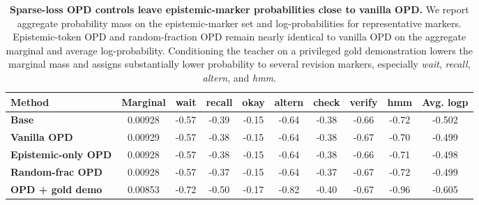 \begin{table}[!htbp]
\centering
\caption{\textbf{Sparse-loss OPD controls leave epistemic-marker probabilities close to vanilla OPD.}
We report aggregate probability mass on the epistemic-marker set and log-probabilities for representative markers. Epistemic-token OPD and random-fraction OPD remain nearly identical to vanilla OPD on the aggregate marginal and average log-probability. Conditioning the teacher on a privileged gold demonstration lowers the marginal mass and assigns substantially lower probability to several revision markers, especially \textit{wait}, \textit{recall}, \textit{altern}, and \textit{hmm}.}
\label{tab:opd_ablation_epistemic_logprobs}
\scriptsize
\setlength{\tabcolsep}{2pt}
\renewcommand{\arraystretch}{1.12}

\begin{tabular*}{\textwidth}{@{\extracolsep{\fill}}lccccccccc@{}}
\toprule
\textbf{Method}
& \textbf{Marginal}
& \textbf{wait}
& \textbf{recall}
& \textbf{okay}
& \textbf{altern}
& \textbf{check}
& \textbf{verify}
& \textbf{hmm}
& \textbf{Avg. logp} \\
\midrule
\textbf{Base}
& 0.00928
& -0.57
& -0.39
& -0.15
& -0.64
& -0.38
& -0.66
& -0.72
& -0.502 \\
\textbf{Vanilla OPD}
& 0.00929
& -0.57
& -0.38
& -0.15
& -0.64
& -0.38
& -0.67
& -0.70
& -0.499 \\
\textbf{Epistemic-only OPD}
& 0.00928
& -0.57
& -0.38
& -0.15
& -0.64
& -0.38
& -0.66
& -0.71
& -0.498 \\
\textbf{Random-frac OPD}
& 0.00928
& -0.57
& -0.37
& -0.15
& -0.64
& -0.37
& -0.67
& -0.72
& -0.499 \\
\textbf{OPD + gold demo}
& 0.00853
& -0.72
& -0.50
& -0.17
& -0.82
& -0.40
& -0.67
& -0.96
& -0.605 \\
\bottomrule
\end{tabular*}
\end{table}
